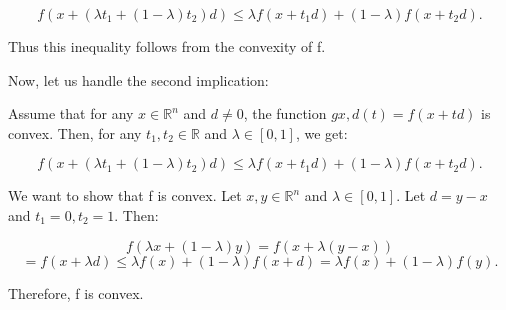 \documentclass{article}
\newcommand{\RR}{\mathbb{R}}
\begin{document}
\[f(x + (\lambda t_1 + (1 - \lambda) t_2) d) \leq \lambda f(x + t_1 d) + (1 - \lambda) f(x + t_2 d).\]

Thus this inequality follows from the convexity of f.


Now, let us handle the second implication:

Assume that for any $x \in \RR^n$ and $d \neq 0$, the function
$g{x,d}(t) = f(x + t d)$ is convex. Then, for any $t_1, t_2 \in \RR$
and $\lambda \in [0, 1]$, we get:

\[f(x + (\lambda t_1 + (1 - \lambda) t_2) d) \leq \lambda f(x + t_1 d) + (1 - \lambda) f(x + t_2 d).\]

We want to show that f is convex. Let $x, y \in \RR^n$ and $\lambda \in [0, 1]$. Let $d = y-x$
and $t_1 = 0, t_2 = 1$. Then:

\[f(\lambda x + (1 - \lambda) y) = f(x + \lambda (y - x))\]
\[= f(x + \lambda d) \leq \lambda f(x) + (1 - \lambda) f(x + d) = \lambda f(x) + (1 - \lambda) f(y).\]

Therefore, f is convex.
\end{document}
